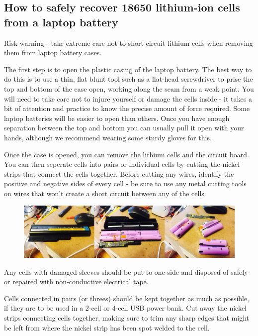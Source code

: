 \documentclass{article}
\theoremstyle{definition}
\theoremstyle{definition}
\theoremstyle{remark}
\begin{document}

  \subsection{How to safely recover 18650 lithium-ion cells from a laptop battery} %
  \label{sub:how_to_safely_recover_18650_lithium_ion_cells_from_a_laptop_battery}
  
    Risk warning - take extreme care not to short circuit lithium cells when removing them from laptop battery cases. 

    The first step is to open the plastic casing of the laptop battery. The best way to do this is to use a thin, flat blunt tool such as a flat-head screwdriver to prise the top and bottom of the case open, working along the seam from a weak point. You will need to take care not to injure yourself or damage the cells inside - it takes a bit of attention and practice to know the precise amount of force required. Some laptop batteries will be easier to open than others. Once you have enough separation between the top and bottom you can usually pull it open with your hands, although we recommend wearing some sturdy gloves for this.

    Once the case is opened, you can remove the lithium cells and the circuit board. You can then seperate cells into pairs or individual cells by cutting the nickel strips that connect the cells together. Before cutting any wires, identify the positive and negative sides of every cell - be sure to use any metal cutting tools on wires that won’t create a short circuit between any of the cells.

    \begin{figure}[!ht]
      \centering
      \includegraphics[width=0.75\paperwidth]{Images/image_5_3_(battery_disassembly).png}
    \end{figure}

    Any cells with damaged sleeves should be put to one side and disposed of safely or repaired with non-conductive electrical tape.

    Cells connected in pairs (or threes) should be kept together as much as possible, if they are to be used in a 2-cell or 4-cell USB power bank. Cut away the nickel strips connecting cells together, making sure to trim any sharp edges that might be left from where the nickel strip has been spot welded to the cell.
\end{document}
